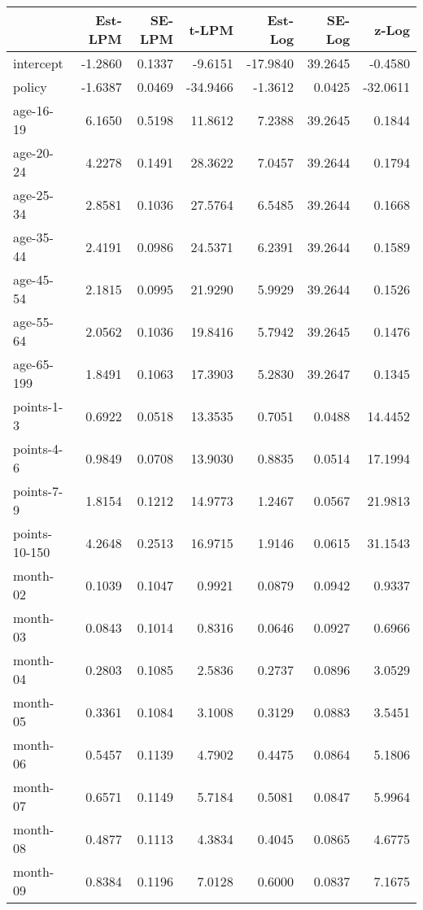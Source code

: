 \documentclass[10pt]{article}
\begin{document}
\begin{table}[ht]
\centering
\begin{tabular}{lrrrrrr}
  \hline
 & Est-LPM & SE-LPM & t-LPM & Est-Log & SE-Log & z-Log \\ 
  \hline
intercept & -1.2860 & 0.1337 & -9.6151 & -17.9840 & 39.2645 & -0.4580 \\ 
  policy & -1.6387 & 0.0469 & -34.9466 & -1.3612 & 0.0425 & -32.0611 \\ 
  age-16-19 & 6.1650 & 0.5198 & 11.8612 & 7.2388 & 39.2645 & 0.1844 \\ 
  age-20-24 & 4.2278 & 0.1491 & 28.3622 & 7.0457 & 39.2644 & 0.1794 \\ 
  age-25-34 & 2.8581 & 0.1036 & 27.5764 & 6.5485 & 39.2644 & 0.1668 \\ 
  age-35-44 & 2.4191 & 0.0986 & 24.5371 & 6.2391 & 39.2644 & 0.1589 \\ 
  age-45-54 & 2.1815 & 0.0995 & 21.9290 & 5.9929 & 39.2644 & 0.1526 \\ 
  age-55-64 & 2.0562 & 0.1036 & 19.8416 & 5.7942 & 39.2645 & 0.1476 \\ 
  age-65-199 & 1.8491 & 0.1063 & 17.3903 & 5.2830 & 39.2647 & 0.1345 \\ 
  points-1-3 & 0.6922 & 0.0518 & 13.3535 & 0.7051 & 0.0488 & 14.4452 \\ 
  points-4-6 & 0.9849 & 0.0708 & 13.9030 & 0.8835 & 0.0514 & 17.1994 \\ 
  points-7-9 & 1.8154 & 0.1212 & 14.9773 & 1.2467 & 0.0567 & 21.9813 \\ 
  points-10-150 & 4.2648 & 0.2513 & 16.9715 & 1.9146 & 0.0615 & 31.1543 \\ 
  month-02 & 0.1039 & 0.1047 & 0.9921 & 0.0879 & 0.0942 & 0.9337 \\ 
  month-03 & 0.0843 & 0.1014 & 0.8316 & 0.0646 & 0.0927 & 0.6966 \\ 
  month-04 & 0.2803 & 0.1085 & 2.5836 & 0.2737 & 0.0896 & 3.0529 \\ 
  month-05 & 0.3361 & 0.1084 & 3.1008 & 0.3129 & 0.0883 & 3.5451 \\ 
  month-06 & 0.5457 & 0.1139 & 4.7902 & 0.4475 & 0.0864 & 5.1806 \\ 
  month-07 & 0.6571 & 0.1149 & 5.7184 & 0.5081 & 0.0847 & 5.9964 \\ 
  month-08 & 0.4877 & 0.1113 & 4.3834 & 0.4045 & 0.0865 & 4.6775 \\ 
  month-09 & 0.8384 & 0.1196 & 7.0128 & 0.6000 & 0.0837 & 7.1675 \\ 

\end{tabular}
\end{table}
\end{document}
